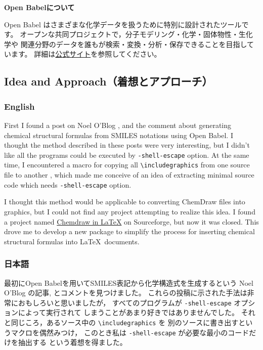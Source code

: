 \documentclass[dvipdfmx,12pt]{jsarticle}
\begin{document}
\noindent \textbf{Open Babelについて}

Open Babel はさまざまな化学データを扱うために特別に設計されたツールです。
オープンな共同プロジェクトで，分子モデリング・化学・固体物性・生化学や
関連分野のデータを誰もが検索・変換・分析・保存できることを目指しています。
詳細は\href{http://openbabel.org/}{公式サイト}を参照してください。

\clearpage

\subsection{Idea and Approach（着想とアプローチ）}

\subsubsection{English}
First I found a post on Noel O'Blog \cite{NOB1}, \cite{NOB2} and
the comment \cite{JLA} about generating chemical structural formulas
from SMILES notations using Open Babel.
I thought the method described in these posts were very interesting,
but I didn't like all the programs could be executed by
\verb|-shell-escape| option.
At the same time, I encountered a macro for copying all
\verb|\includegraphics| from one source file to another \cite{OKU},
which made me conceive of an idea of extracting minimal source code
which needs \verb|-shell-escape| option.

I thought this method would be applicable to converting ChemDraw files into
graphics, but I could not find any project attempting to realize this idea.
I found a project named
\href{http://chemdrawinlatex.sourceforge.net/}{Chemdraw in \LaTeX}
on Sourceforge, but now it was closed.
This drove me to develop a new package to simplify the process for
inserting chemical structural formulas into \LaTeX\ documents.

\subsubsection{日本語}

最初にOpen Babelを用いてSMILES表記から化学構造式を生成するという
Noel O'Blog の記事\cite{NOB1}, \cite{NOB2}とコメント\cite{JLA}を見つけました。
これらの投稿に示された手法は非常におもしろいと思いましたが，
すべてのプログラムが \verb|-shell-escape| オプションによって実行されて
しまうことがあまり好きではありませんでした。
それと同じころ，あるソース中の \verb|\includegraphics| を
別のソースに書き出すというマクロ\cite{OKU}を偶然みつけ，
このとき私は \verb|-shell-escape| が必要な最小のコードだけを抽出する
という着想を得ました。
\end{document}
